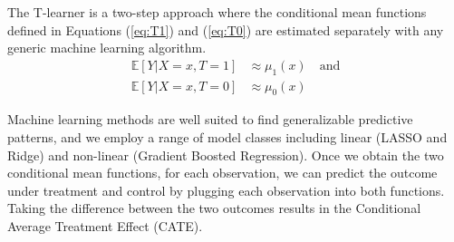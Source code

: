 \documentclass[12pt, a4paper]{article}
\begin{document}
The T-learner is a two-step approach where the conditional mean functions defined in Equations (\ref{eq:T1}) and (\ref{eq:T0}) are estimated separately with any generic machine learning algorithm.
\begin{align}
  \mathbb{E}[Y|X{=}x, T{=}1] &\approx \mu_1(x) \quad \textrm{and} \label{eq:T1} \\
  \mathbb{E}[Y|X{=}x, T{=}0] &\approx \mu_0(x) \label{eq:T0}
\end{align}

Machine learning methods are well suited to find generalizable predictive patterns, and we employ a range of model classes including linear (LASSO and Ridge) and non-linear (Gradient Boosted Regression). Once we obtain the two conditional mean functions, for each observation, we can predict the outcome under treatment and control by plugging each observation into both functions. Taking the difference between the two outcomes results in the Conditional Average Treatment Effect (CATE).

%
\end{document}
